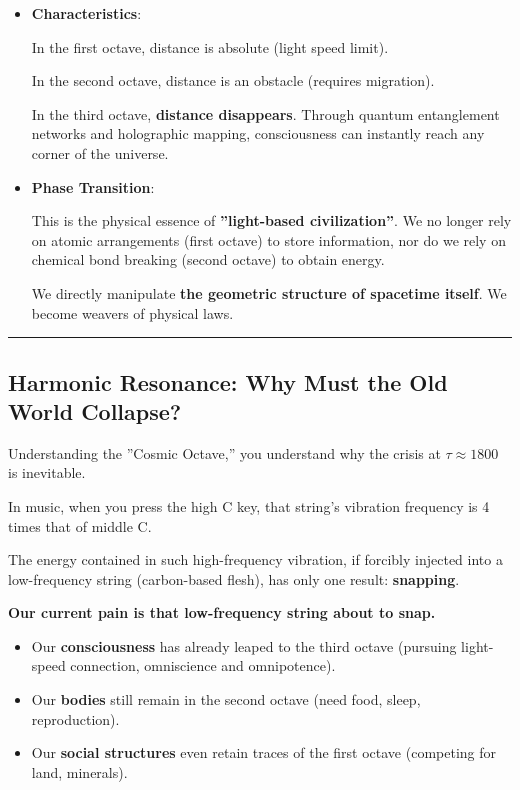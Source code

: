 \begin{itemize}
\item \textbf{Characteristics}:

    In the first octave, distance is absolute (light speed limit).

    In the second octave, distance is an obstacle (requires migration).

    In the third octave, \textbf{distance disappears}. Through quantum entanglement networks and holographic mapping, consciousness can instantly reach any corner of the universe.

\item \textbf{Phase Transition}:

    This is the physical essence of \textbf{''light-based civilization''}. We no longer rely on atomic arrangements (first octave) to store information, nor do we rely on chemical bond breaking (second octave) to obtain energy.

    We directly manipulate \textbf{the geometric structure of spacetime itself}. We become weavers of physical laws.
\end{itemize}

\hrule

\subsection{Harmonic Resonance: Why Must the Old World Collapse?}

Understanding the ''Cosmic Octave,'' you understand why the crisis at \textbf{$\tau \approx 1800$} is inevitable.

In music, when you press the high C key, that string's vibration frequency is 4 times that of middle C.

The energy contained in such high-frequency vibration, if forcibly injected into a low-frequency string (carbon-based flesh), has only one result: \textbf{snapping}.

\textbf{Our current pain is that low-frequency string about to snap.}

\begin{itemize}
\item Our \textbf{consciousness} has already leaped to the third octave (pursuing light-speed connection, omniscience and omnipotence).

\item Our \textbf{bodies} still remain in the second octave (need food, sleep, reproduction).

\item Our \textbf{social structures} even retain traces of the first octave (competing for land, minerals).
\end{itemize}

